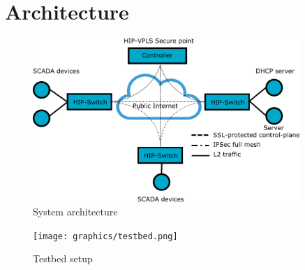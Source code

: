 \chapter{Architecture}

\begin{figure}[h!]
\centering
\includegraphics[width=0.9\textwidth]{graphics/arch.png}
\caption{System architecture}
\label{fig:architecture}
\end{figure}       


\begin{figure}[h!]
\centering
\texttt{[image: graphics/testbed.png]}
\caption{Testbed setup}
\label{fig:testbed}
\end{figure}       
    